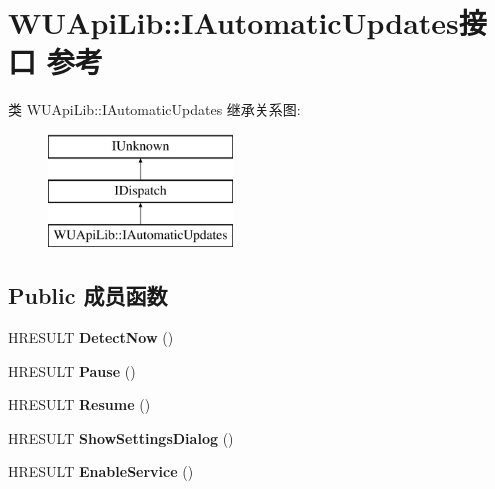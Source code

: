 \hypertarget{interface_w_u_api_lib_1_1_i_automatic_updates}{}\section{W\+U\+Api\+Lib\+:\+:I\+Automatic\+Updates接口 参考}
\label{interface_w_u_api_lib_1_1_i_automatic_updates}
类 W\+U\+Api\+Lib\+:\+:I\+Automatic\+Updates 继承关系图\+:\begin{figure}[H]
\begin{center}
\leavevmode
\includegraphics[height=3.000000cm]{interface_w_u_api_lib_1_1_i_automatic_updates}
\end{center}
\end{figure}
\subsection*{Public 成员函数}
\begin{DoxyCompactItemize}
\item 
\mbox{\label{interface_w_u_api_lib_1_1_i_automatic_updates_a8fbdf5feae06ce466a9607a313d2af1f}} 
H\+R\+E\+S\+U\+LT {\bfseries Detect\+Now} ()
\item 
\mbox{\label{interface_w_u_api_lib_1_1_i_automatic_updates_a976f4aec2a4e9e3b86b47a66975ed875}} 
H\+R\+E\+S\+U\+LT {\bfseries Pause} ()
\item 
\mbox{\label{interface_w_u_api_lib_1_1_i_automatic_updates_afb8efd9673b27d1b4eac03656e833afb}} 
H\+R\+E\+S\+U\+LT {\bfseries Resume} ()
\item 
\mbox{\label{interface_w_u_api_lib_1_1_i_automatic_updates_aede4e69bca5fd69790976a24d2c3a6e0}} 
H\+R\+E\+S\+U\+LT {\bfseries Show\+Settings\+Dialog} ()
\item 
\mbox{\label{interface_w_u_api_lib_1_1_i_automatic_updates_a70ebefcb90c51ccdc32604a42f440f9d}} 
H\+R\+E\+S\+U\+LT {\bfseries Enable\+Service} ()
\end{DoxyCompactItemize}
